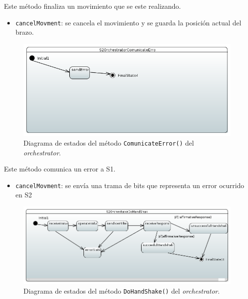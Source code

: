 Este método finaliza un movimiento que se este realizando.

\begin{itemize}
    \item \texttt{cancelMovment}: se cancela el movimiento y se guarda la posición actual del brazo.
    
\end{itemize}

\begin{figure}[H]
    \centering
    \includegraphics[width=1\linewidth]{pictures/S2OrchestratorComunicateError.PNG}
    \caption{Diagrama de estados del método \texttt{ComunicateError()} del \textit{orchestrator}.}
    \label{fig:fun_comunicate_error_orchestrator}
\end{figure}

Este método comunica un error a \ac{S1}.

\begin{itemize}
    \item \texttt{cancelMovment}: se envía una trama de bits que representa un error ocurrido en \ac{S2}
    
\end{itemize}

\begin{figure}[H]
    \centering
    \includegraphics[width=1\linewidth]{pictures/S2OrchestratorDoHandShake.PNG}
    \caption{Diagrama de estados del método \texttt{DoHandShake()} del \textit{orchestrator}.}
    \label{fig:fun_do_hand_shake_orchestrator}
\end{figure}

